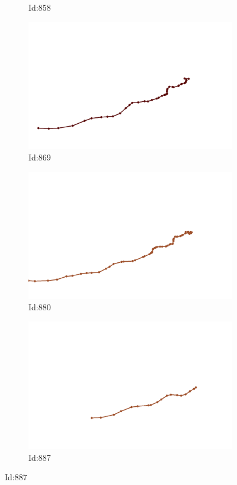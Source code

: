 \documentclass[12pt,twoside]{report}
\begin{document}
\begin{figure}
\begin{subfigure}[b]{0.20\textwidth}
\caption{Id:858}
\end{subfigure}
\begin{subfigure}[b]{0.20\textwidth}
\centering
\includegraphics[width=\textwidth]{../trajectories/869.png}
\caption{Id:869}
\end{subfigure}
\begin{subfigure}[b]{0.20\textwidth}
\centering
\includegraphics[width=\textwidth]{../trajectories/880.png}
\caption{Id:880}
\end{subfigure}
\begin{subfigure}[b]{0.20\textwidth}
\centering
\includegraphics[width=\textwidth]{../trajectories/887.png}
\caption{Id:887}
\end{subfigure}
\end{figure}
\end{document}
